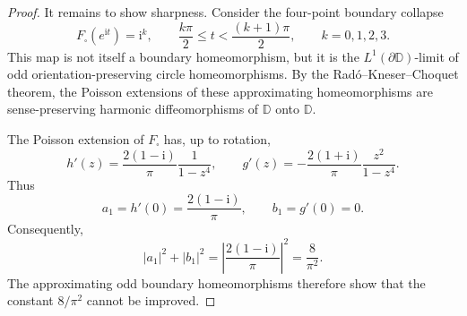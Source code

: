 \documentclass[10pt,a4paper]{amsart}
\newcommand{\D}{\mathbb D}
\newcommand{\ii}{\mathrm i}
\begin{document}
\begin{proof}
It remains to show sharpness. Consider the four-point boundary collapse
\[
        F_\square(e^{\ii t})=\ii^k,
        \qquad
        \frac{k\pi}{2}\leq t<\frac{(k+1)\pi}{2},
        \qquad k=0,1,2,3.
\]
This map is not itself a boundary homeomorphism, but it is the
$L^1(\partial\D)$-limit of odd orientation-preserving circle
homeomorphisms. By the Radó--Kneser--Choquet theorem, the Poisson
extensions of these approximating homeomorphisms are sense-preserving
harmonic diffeomorphisms of $\D$ onto $\D$.

The Poisson extension of $F_\square$ has, up to rotation,
\[
        h'(z)=\frac{2(1-\ii)}{\pi}\frac1{1-z^4},
        \qquad
        g'(z)=-\frac{2(1+\ii)}{\pi}\frac{z^2}{1-z^4}.
\]
Thus
\[
        a_1=h'(0)=\frac{2(1-\ii)}{\pi},
        \qquad
        b_1=g'(0)=0.
\]
Consequently,
\[
        |a_1|^2+|b_1|^2
        =
        \left|\frac{2(1-\ii)}{\pi}\right|^2
        =
        \frac8{\pi^2}.
\]
The approximating odd boundary homeomorphisms therefore show that the
constant $8/\pi^2$ cannot be improved.
\end{proof}
\end{document}
